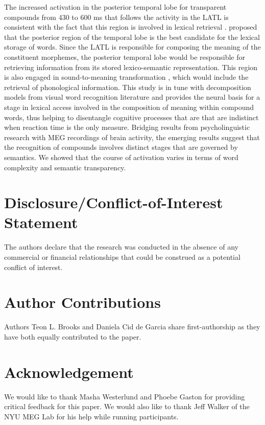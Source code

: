 \documentclass{frontiersSCNS}
\begin{document}
The increased activation in the posterior temporal lobe for transparent compounds from 430 to 600 ms that follows the activity in the LATL is consistent with the fact that this region is involved in lexical retrieval \citep*{Lau:2008, Hickok:2007}. \cite{Lau:2008} proposed that the posterior region of the temporal lobe is the best candidate for the lexical storage of words. Since the LATL is responsible for composing the meaning of the constituent morphemes, the posterior temporal lobe would be responsible for retrieving information from its stored lexico-semantic representation. This region is also engaged in sound-to-meaning transformation \citep*{Binder:2000}, which would include the retrieval of phonological information. 
This study is in tune with decomposition models from visual word recognition literature and provides the neural basis for a stage in lexical access involved in the composition of meaning within compound words, thus helping to disentangle cognitive processes that are that are indistinct when reaction time is the only measure.  Bridging results from psycholinguistic research with MEG recordings of brain activity, the emerging results suggest that the recognition of compounds involves distinct stages that are governed by semantics. We showed that the course of activation varies in terms of word complexity and semantic transparency. 

\section*{Disclosure/Conflict-of-Interest Statement}
The authors declare that the research was conducted in the absence of any commercial or financial relationships that could be construed as a potential conflict of interest.

\section*{Author Contributions}
Authors Teon L. Brooks and Daniela Cid de Garcia share first-authorship as they have both equally contributed to the paper.

\section*{Acknowledgement}
We would like to thank Masha Westerlund and Phoebe Gaston for providing critical feedback for this paper. We would also like to thank Jeff Walker of the NYU MEG Lab for his help while running participants.
\end{document}
